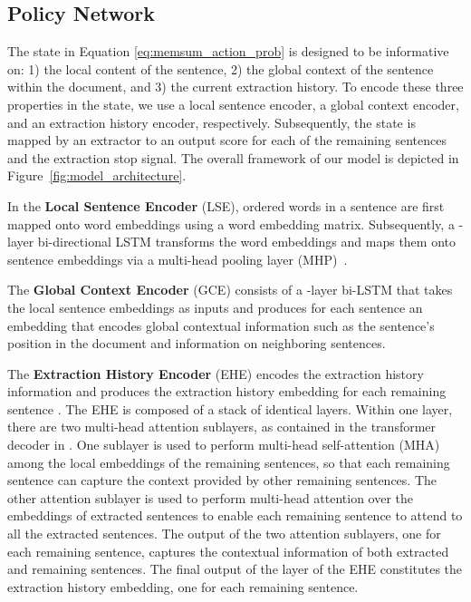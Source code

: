 \documentclass[11pt]{article}
\begin{document}
\subsection{Policy Network}
\label{sec:policy_network_structure}
The state  in Equation \eqref{eq:memsum_action_prob} is designed to be informative on: 1) the local content of the sentence, 2) the global context of the sentence within the document, and 3) the current extraction history. To encode these three properties in the state, we use a local sentence encoder, a global context encoder, and an extraction history encoder, respectively. Subsequently, the state is mapped by an extractor to an output score for each of the remaining sentences and the extraction stop signal. The overall framework of our model is depicted in Figure~\ref{fig:model_architecture}. 


In the \textbf{Local Sentence Encoder} (LSE), ordered words  in a sentence  are first mapped onto word embeddings using a word embedding matrix. Subsequently, a -layer bi-directional LSTM \cite{hochreiter1997long} transforms the word embeddings and maps them onto sentence embeddings  via a multi-head pooling layer (MHP)~\cite{liu2019hierarchical}.


The \textbf{Global Context Encoder} (GCE) consists of a -layer bi-LSTM that takes the  local sentence embeddings  as inputs and produces for each sentence  an embedding  that encodes global contextual information such as the sentence's position in the document and information on neighboring sentences.


The \textbf{Extraction History Encoder} (EHE) encodes the extraction history information and produces the extraction history embedding  for each remaining sentence .
The EHE is composed of a stack of  identical layers. Within one layer, there are two multi-head attention sublayers, as contained in the transformer decoder in \citet{vaswani2017attention}. One  sublayer is used to perform multi-head self-attention (MHA) among the local embeddings of the remaining sentences, so that each remaining sentence can capture the context provided by other remaining sentences. The other attention sublayer is used to perform multi-head attention over the embeddings of extracted sentences to enable each remaining sentence to attend to all the extracted sentences. The output of the two attention sublayers, one for each remaining sentence, captures the contextual information of both extracted and remaining sentences. The final output of the  layer of the EHE constitutes the extraction history embedding, one for each remaining sentence. 
\end{document}
